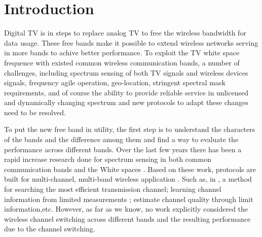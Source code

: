 
\section{Introduction}
\label{sec:introduction}


Digital TV is in steps to replace analog TV to free the wireless bandwidth for data usage. These free bands make it possible to extend wireless networks serving in more bands to achive better performance. To exploit the TV white space frequence with existed common wireless communication bands, a number of challenges, including spectrum sensing of both TV signals and wireless devices signals, frequency agile operation, geo-location, stringent spectral
mask requirements, and of course the ability to provide reliable
service in unlicensed and dynamically changing spectrum \cite{shellhammer2009technical} and new protocols to adapt these changes need to be resolved. 

To put the new free band in utility, the first step is to understand the characters of the bands and the difference among them and find a way to evaluate the performance across different bands.
Over the last few years there has been a rapid increase research done for spectrum sensing in both common communication bands and the White spaces \cite{rayanchu2011fluid, kim1996pulse,cabric2004implementation}. Based on these work, protocols are built for multi-channel, multi-band wireless application \cite{MOAR,raychaudhuri2003spectrum,sabharwal2007opportunistic}.  Such as, in \cite{mo2005comparison}, a method for searching the most efficient transmission channel; learning channel information from limited measurements \cite{rayanchu2011fluid, sabharwal2007opportunistic}; estimate channel quality through limit information\cite{MOAR},etc. However, as far as we know, no work explicitly considered the wireless channel switching across different bands and the resulting performance due to the channel switching.

